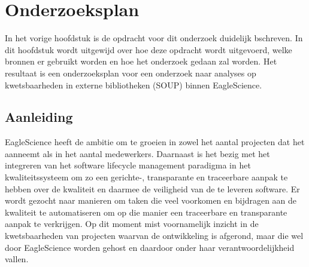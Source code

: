 \chapter{Onderzoeksplan}\label{ch:onderzoekPlan}

In het vorige hoofdstuk is de opdracht voor dit onderzoek duidelijk bschreven. In dit hoofdstuk wordt uitgewijd over hoe deze opdracht wordt uitgevoerd, welke bronnen er gebruikt worden en hoe het onderzoek gedaan zal worden. Het resultaat is een onderzoeksplan voor een onderzoek naar analyses op kwetsbaarheden in externe bibliotheken (SOUP) binnen EagleScience.


\section{Aanleiding}\label{sec:OP_aanleiding}
EagleScience heeft de ambitie om te groeien in zowel het aantal projecten dat het aanneemt als in het aantal medewerkers. Daarnaast is het bezig met het integreren van het software lifecycle management paradigma in het kwaliteitssysteem om zo een gerichte-, transparante en traceerbare aanpak te hebben over de kwaliteit en daarmee de veiligheid van de te leveren software. Er wordt gezocht naar manieren om taken die veel voorkomen en bijdragen aan de kwaliteit te automatiseren om op die manier een traceerbare en transparante aanpak te verkrijgen. Op dit moment mist voornamelijk inzicht in de kwetsbaarheden van projecten waarvan de ontwikkeling is afgerond, maar die wel door EagleScience worden gehost en daardoor onder haar verantwoordelijkheid vallen.


